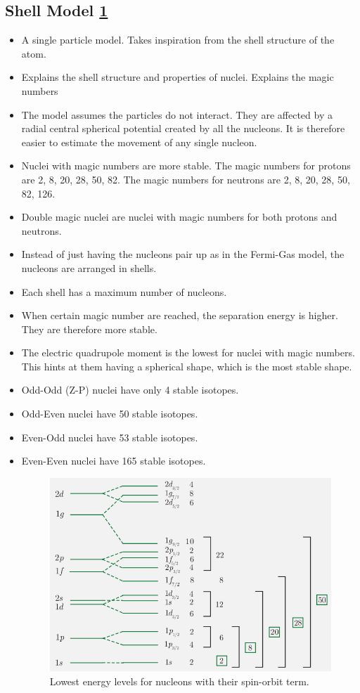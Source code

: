 \subsection{Shell Model \cref{fig: shell_model_energy_levels}}
\begin{itemize}
    \item A single particle model. Takes inspiration from the shell structure of the atom. 
    \item Explains the shell structure and properties of nuclei. Explains the magic numbers 
    \item The model assumes the particles do not interact. They are affected by a radial central spherical potential created by all the nucleons. It is therefore easier to estimate the movement of any single nucleon. 
    \item Nuclei with magic numbers are more stable. The magic numbers for protons are 2, 8, 20, 28, 50, 82. The magic numbers for neutrons are 2, 8, 20, 28, 50, 82, 126.
    \item Double magic nuclei are nuclei with magic numbers for both protons and neutrons.
    \item Instead of just having the nucleons pair up as in the Fermi-Gas model, the nucleons are arranged in shells.
    \item Each shell has a maximum number of nucleons.
    \item When certain magic number are reached, the separation energy is higher. They are therefore more stable.
    \item The electric quadrupole moment is the lowest for nuclei with magic numbers. This hints at them having a spherical shape, which is the most stable shape.
    \item Odd-Odd (Z-P) nuclei have only 4 stable isotopes. 
    \item Odd-Even nuclei have 50 stable isotopes.
    \item Even-Odd nuclei have 53 stable isotopes.
    \item Even-Even nuclei have 165 stable isotopes.
    
    \begin{figure}[h!]
    \centering
    \includegraphics[width = .75\textwidth]{shell_model_energy_levels.png}
    \caption{Lowest energy levels for nucleons with their spin-orbit term.}
    \label{fig: shell_model_energy_levels}
    \end{figure}
    
\end{itemize}

